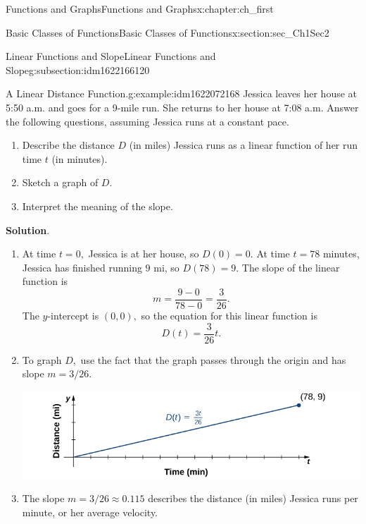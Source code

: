 \documentclass[oneside,10pt,]{book}
\newcommand{\blocktitlefont}{\relax}
\numberwithin{equation}{section}
\begin{document}
\begin{chapterptx}{Functions and Graphs}{}{Functions and Graphs}{}{}{x:chapter:ch_first}
\begin{sectionptx}{Basic Classes of Functions}{}{Basic Classes of Functions}{}{}{x:section:sec_Ch1Sec2}
\begin{subsectionptx}{Linear Functions and Slope}{}{Linear Functions and Slope}{}{}{g:subsection:idm1622166120}
\begin{example}{A Linear Distance Function.}{g:example:idm1622072168}
Jessica leaves her house at 5:50 a.m. and goes for a 9-mile run. She returns to her house at 7:08 a.m. Answer the following questions, assuming Jessica runs at a constant pace.%
%
\begin{enumerate}
\item{}Describe the distance \(D\) (in miles) Jessica runs as a linear function of her run time \(t\) (in minutes).%
\item{}Sketch a graph of \(D.\)%
\item{}Interpret the meaning of the slope.%
\end{enumerate}
\par\smallskip%
\noindent\textbf{\blocktitlefont Solution}.\hypertarget{g:solution:idm1622071656}{}\quad{}%
\begin{enumerate}
\item{}At time \(t= 0 ,\) Jessica is at her house, so \(D( 0 )= 0 .\) At time \(t= 78 \) minutes, Jessica has finished running \(9 \) mi, so \(D( 78 )= 9 .\) The slope of the linear function is%
\begin{equation*}
m= \frac{ 9 - 0 }{ 78 - 0 }=\frac{ 3 }{ 26 }.
\end{equation*}
 The \(y\)-intercept is \(( 0 , 0 ),\) so the equation for this linear function is%
\begin{equation*}
D(t)=\frac{ 3 }{ 26 }t.
\end{equation*}
%
\item{}To graph \(D,\) use the fact that the graph passes through the origin and has slope \(m= 3  / 26 .\) \begin{image}{0.25}{0.5}{0.25}%
\includegraphics[width=\linewidth]{external/CNX_Calc_Figure_01_02_003.jpg}
\end{image}%
%
\item{}The slope \(m= 3  / 26 \approx 0.115 \) describes the distance (in miles) Jessica runs per minute, or her average velocity.%
\end{enumerate}
\end{example}
\end{subsectionptx}
%
%
\typeout{************************************************}

\end{sectionptx}
\end{chapterptx}
\end{document}

